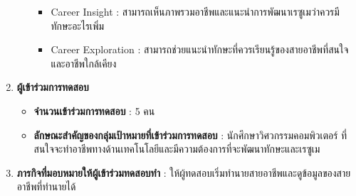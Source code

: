 \begin{enumerate}
\begin{itemize}
\begin{itemize}
                        \item Career Insight : สามารถเห็นภาพรวมอาชีพและแนะนำการพัฒนาเรซูเมว่าควรมีทักษะอะไรเพิ่ม
                        \item Career Exploration : สามารถช่วยแนะนำทักษะที่ควรเรียนรู้ของสายอาชีพที่สนใจและอาชีพใกล้เคียง
                    \end{itemize}
          \end{itemize}
    \item \textbf{ผู้เข้าร่วมการทดสอบ}
          \begin{itemize}
              \item \textbf{จำนวนเข้าร่วมการทดสอบ} : 5 คน
              \item \textbf{ลักษณะสำคัญของกลุ่มเป้าหมายที่เข้าร่วมการทดสอบ} : นักศึกษาวิศวกรรมคอมพิวเตอร์ ที่สนใจจะทำอาชีพทางด้านเทคโนโลยีและมีความต้องการที่จะพัฒนาทักษะและเรซูเม
          \end{itemize}
    \item \textbf{ภารกิจที่มอบหมายให้ผู้เข้าร่วมทดสอบทำ} : ให้ผู้ทดสอบเริ่มทำนายสายอาชีพและดูข้อมูลของสายอาชีพที่ทำนายได้
\end{enumerate}
